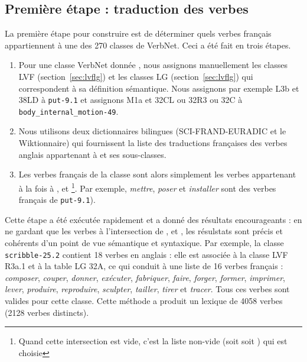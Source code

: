 \subsection{Première étape : traduction des verbes}\label{first}

La première étape pour construire \verbenet{} est de déterminer quels verbes
français appartiennent à une des 270 classes de VerbNet. Ceci a été fait en
trois étapes.

\begin{enumerate}
    \item Pour une classe VerbNet donnée \Ce{}, nous assignons manuellement les
        classes LVF (section~\ref{sec:lvflg}) \Clvf{} et les classes LG
        (section~\ref{sec:lvflg}) \Clg{} qui correspondent à sa définition
        sémantique. Nous assignons par exemple {\color{red}L3b} et
        {\color{green}38LD} à {\color{blue}\texttt{put-9.1}} et assignons
        {\color{red}M1a} et {\color{green}32CL ou 32R3 ou 32C} à
        {\color{blue}\texttt{body\_internal\_motion-49}}.
    \item Nous utilisons deux dictionnaires bilingues (SCI-FRAND-EURADIC et le
        Wiktionnaire) qui fournissent la liste \Ltrad{} des traductions
        françaises des verbes anglais appartenant à \Ce{} et ses sous-classes.
    \item Les verbes français de la classe \Ce{} sont alors simplement les
        verbes appartenant à la fois à \Ltrad{}, \Clvf{} et
        \Clg{}\footnote{Quand cette intersection est vide, c'est la liste
        non-vide (soit \Clvf{} soit \Clg{}) qui est choisie}. Par exemple,
        \textit{mettre}, \textit{poser} et \textit{installer} sont des verbes
        français de {\color{blue}\texttt{put-9.1}}).
\end{enumerate}

Cette étape a été exécutée rapidement et a donné des résultats encourageants :
en ne gardant que les verbes à l'intersection de \Ltrad{}, \Clvf{} et \Clg{},
les résulstats sont précis et cohérents d'un point de vue sémantique et
syntaxique. Par exemple, la classe {\color{blue}\texttt{scribble-25.2}}
contient 18 verbes en anglais : elle est associée à la classe LVF
{\color{red}R3a.1} et à la table LG {\color{green}32A}, ce qui conduit à une
liste de 16 verbes français : \textit{composer}, \textit{couper}, \textit{donner},
\textit{exécuter}, \textit{fabriquer}, \textit{faire}, \textit{forger}, \textit{former},
\textit{imprimer}, \textit{lever}, \textit{produire}, \textit{reproduire},
\textit{sculpter}, \textit{tailler}, \textit{tirer} et \textit{tracer}. Tous ces verbes
sont valides pour cette classe.  Cette méthode a produit un lexique de 4058
verbes (2128 verbes distincts).

